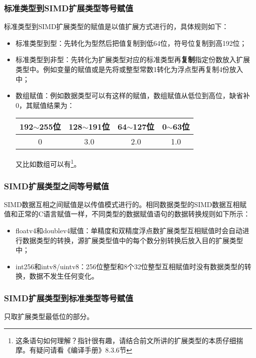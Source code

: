 \subsubsection{标准类型到SIMD扩展类型等号赋值}
标准类型到SIMD扩展类型的赋值是以值扩展方式进行的，具体规则如下：
\begin{itemize}
	\item 标准类型到型：先转化为型然后把值复制到低64位，符号位复制到高192位；
	\item 标准类型到非型：先转化为扩展类型对应的标准类型再\textbf{复制}指定份数放入扩展类型中。例如变量的赋值或是先将或整型常数1转化为浮点型再复制4份放入中；
	\item 数组赋值：例如数据类型可以有这样的赋值，数组赋值从低位到高位，缺省补0，其赋值结果为：
	      \begin{center}
		      \begin{tabular}{|c|c|c|c|}
			      \hline
			      192$\sim$255位 & 128$\sim$191位 & 64$\sim$127位 & 0$\sim$63位 \\
			      \hline
			      0              & 3.0            & 2.0           & 1.0         \\
			      \hline
		      \end{tabular}
	      \end{center}
	      又比如数组可以有\footnote{这条语句如何理解？指针很有趣，请结合前文所讲的扩展类型的本质仔细揣摩。有疑问请看《编译手册》8.3.6节}。
\end{itemize}

\subsubsection{SIMD扩展类型之间等号赋值}
SIMD数据互相之间赋值是以传值模式进行的。相同数据类型的SIMD数据互相赋值和正常的C语言赋值一样，不同类型的数据赋值语句的数据转换规则如下所示：
\begin{itemize}
	\item floatv4和doublev4赋值：单精度和双精度浮点数扩展类型互相赋值时会自动进行数据类型的转换，源扩展类型值中的每个数分别转换后放入目的扩展类型中；
	\item int256和intv8/uintv8：256位整型和8个32位整型互相赋值时没有数据类型的转换，数据不发生任何变化。
\end{itemize}

\subsubsection{SIMD扩展类型到标准类型等号赋值}
只取扩展类型最低位的部分。

